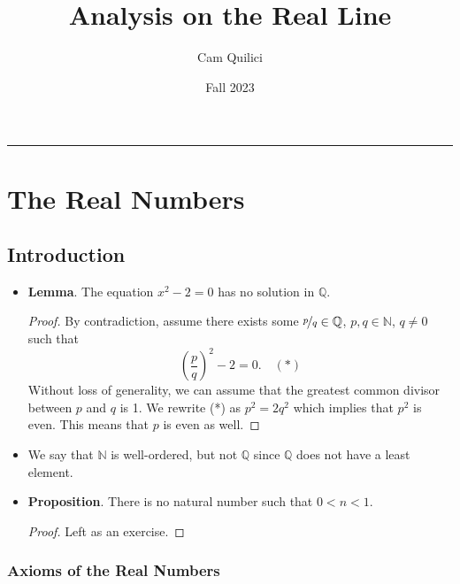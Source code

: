 \documentclass{article}
\title{Analysis on the Real Line}
\author{Cam Quilici}
\date{Fall 2023}
\newcommand{\Q}{\mathbb{Q}}
\newcommand{\N}{\mathbb{N}}
\newcommand{\?}{\stackrel{?}{=}}
\begin{document}
\maketitle

\vspace{-0.3in}
\noindent
\rule{\linewidth}{0.4pt}

\section*{The Real Numbers}

\subsection*{Introduction}

\begin{itemize}
    \item \textbf{Lemma}. The equation $x^2 - 2 = 0$ has no solution in $\Q$.
    \begin{proof}
        By contradiction, assume there exists some $\nicefrac{p}{q} \in \Q$, $p, q \in \N$, $q \neq 0$ such that
        $$\left(\frac{p}{q}\right)^2 - 2 = 0. \quad (*)$$
        Without loss of generality, we can assume that the greatest common divisor between $p$ and $q$ is 1. We rewrite (*) as $p^2 = 2q^2$ which implies that $p^2$ is even. This means that $p$ is even as well.
    \end{proof}
    \item We say that $\N$ is well-ordered, but not $\Q$ since $\Q$ does not have a least element.
    \item \textbf{Proposition}. There is no natural number such that $0 < n < 1$.
    \begin{proof}
        Left as an exercise.
    \end{proof}
\end{itemize}

\subsubsection*{Axioms of the Real Numbers}
\end{document}
